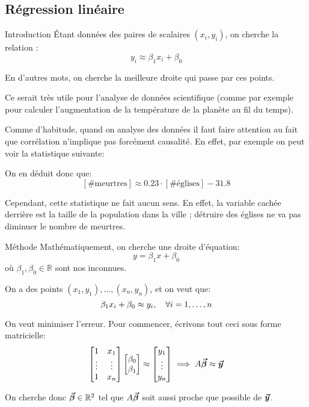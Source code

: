\documentclass[a4paper]{article}
\begin{document}
\subsection{Régression linéaire}
\begin{parag}{Introduction}
    Étant données des paires de scalaires $\left(x_i, y_i\right)$, on cherche la relation :
    \[y_i \approx \beta_1 x_i + \beta_0\]

    En d'autres mots, on cherche la meilleure droite qui passe par ces points.

    Ce serait très utile pour l'analyse de données scientifique (comme par exemple pour calculer l'augmentation de la température de la planète au fil du temps).

    Comme d'habitude, quand on analyse des données il faut faire attention au fait que corrélation n'implique pas forcément causalité. En effet, par exemple on peut voir la statistique suivante:


    On en déduit donc que:
    \[\left[\# \text{meurtres}\right] \approx 0.23\cdot\left[\# \text{églises}\right] - 31.8\]

    Cependant, cette statistique ne fait aucun sens. En effet, la variable cachée derrière est la taille de la population dans la ville ; détruire des églises ne va pas diminuer le nombre de meurtres.
\end{parag}

\begin{parag}{Méthode}
    Mathématiquement, on cherche une droite d'équation:
    \[y = \beta_1 x + \beta_0\]
    où $\beta_1, \beta_0 \in \mathbb{R}$ sont nos inconnues.

    On a des points $\left(x_1, y_1\right), \ldots, \left(x_n, y_n\right)$, et on veut que:
    \[\beta_1 x_i + \beta_0 \approx y_i, \quad \forall i = 1, \ldots, n\]

    On veut minimiser l'erreur. Pour commencer, écrivons tout ceci sous forme matricielle:
    \[\begin{bmatrix} 1 & x_1 \\ \vdots & \vdots \\ 1 & x_n \end{bmatrix} \begin{bmatrix} \beta_0 \\ \beta_1 \end{bmatrix} \approx \begin{bmatrix} y_1 \\ \vdots \\ y_n \end{bmatrix} \implies A \bm{\protect\vec{\beta}} \approx \bm{\protect\vec{y}}\]

    On cherche donc $\bm{\protect\vec{\beta}} \in \mathbb{R}^2$ tel que $A \bm{\protect\vec{\beta}}$ soit aussi proche que possible de $\bm{\protect\vec{y}}$.
\end{parag}
\end{document}
